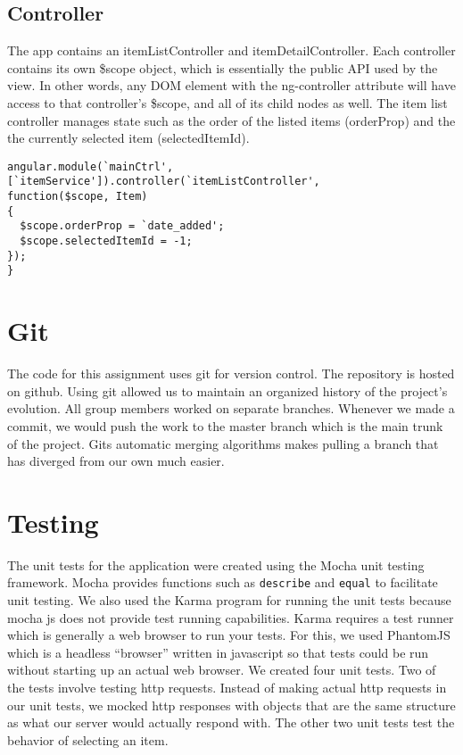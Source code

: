 \documentclass[letterpaper, 12pt]{article}
\begin{document}
\subsection{Controller}
\noindent The app contains an itemListController and itemDetailController.  Each controller contains its own \$scope object, which is essentially the public API used by the view. In other words, any DOM element with the ng-controller attribute will have access to that controller's \$scope, and all of its child nodes as well. The item list controller manages state such as the order of the listed items (orderProp) and the the currently selected item (selectedItemId).

\vspace{2mm}
\vspace{-3mm}\begin{verbatim}
angular.module(`mainCtrl',
[`itemService']).controller(`itemListController',
function($scope, Item) 
{
  $scope.orderProp = `date_added';
  $scope.selectedItemId = -1;
}); 
}
\end{verbatim}

\section{Git}
The code for this assignment uses git for version control. The repository is
hosted on github.  Using git allowed us to maintain an organized history of the project's evolution.  All group members worked on separate branches. Whenever we made a commit, we would push the work to the master branch which is the main trunk of the project. Gits automatic merging algorithms makes pulling a branch that has diverged from our own much easier.

\section{Testing}
The unit tests for the application were created using the Mocha unit testing framework.  Mocha provides functions such as \texttt{describe} and \texttt{equal} to facilitate unit testing. We also used the Karma program for running the unit tests because mocha js does not provide test running capabilities. Karma requires a test runner which is generally a web browser to run your tests.  For this, we used PhantomJS which is a headless ``browser'' written in javascript so that tests could be run without starting up an actual web browser.  We created four unit tests.  Two of the tests involve testing http requests.  Instead of making actual http requests in our unit tests, we mocked http responses with objects that are the same structure as what our server would actually respond with.  The other two unit tests test the behavior of selecting an item.
\end{document}
